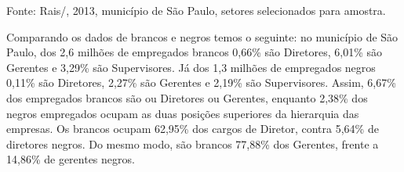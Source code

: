 \medskip

\noindent{}

\smallskip

\noindent{}

\begin{center}
{\scriptsize{Fonte: Rais/, 2013, município de São Paulo, setores selecionados para amostra.}}
\end{center}

\medskip

Comparando os dados de brancos e negros temos o seguinte: no município
de São Paulo, dos 2,6 milhões de empregados brancos 0,66\% são
Diretores, 6,01\% são Gerentes e 3,29\% são Supervisores. Já dos 1,3
milhões de empregados negros 0,11\% são Diretores, 2,27\% são Gerentes e
2,19\% são Supervisores. Assim, 6,67\% dos empregados brancos são ou
Diretores ou Gerentes, enquanto 2,38\% dos negros empregados ocupam as
duas posições superiores da hierarquia das empresas. Os brancos ocupam
62,95\% dos cargos de Diretor, contra 5,64\% de diretores negros. Do
mesmo modo, são brancos 77,88\% dos Gerentes, frente a 14,86\% de
gerentes negros.

